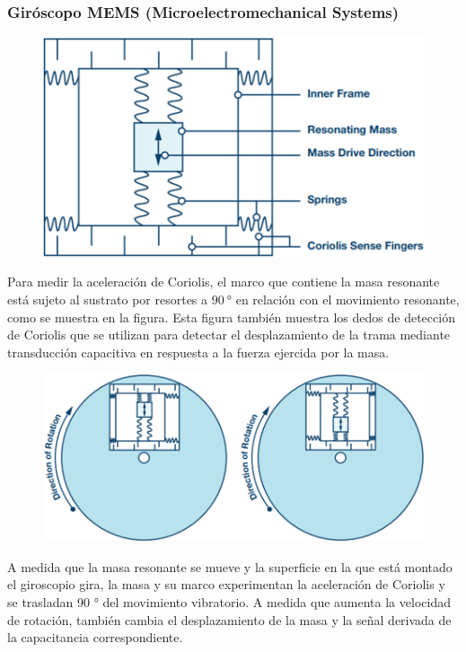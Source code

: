 \begin{frame}
    \frametitle{Giróscopo MEMS (Microelectromechanical Systems)}
    \footnotesize

    \begin{figure}[!h]
        \centering
        \includegraphics[width=0.3\columnwidth]{images/gyroscope_mems_structure.png}
    \end{figure}


    Para medir la aceleración de Coriolis, el marco que contiene la masa resonante está sujeto al sustrato por resortes a $\SI{90}{\degree}$ en relación con el movimiento resonante, como se muestra en la figura. Esta figura también muestra los dedos de detección de Coriolis que se utilizan para detectar el desplazamiento de la trama mediante transducción capacitiva en respuesta a la fuerza ejercida por la masa.

    \begin{figure}[!h]
        \centering
        \includegraphics[width=0.4\columnwidth]{images/gyroscope_mems_3.png}
    \end{figure}

    A medida que la masa resonante se mueve y la superficie en la que está montado el giroscopio gira, la masa y su marco experimentan la aceleración de Coriolis y se trasladan 90 ° del movimiento vibratorio. A medida que aumenta la velocidad de rotación, también cambia el desplazamiento de la masa y la señal derivada de la capacitancia correspondiente.
\end{frame}



